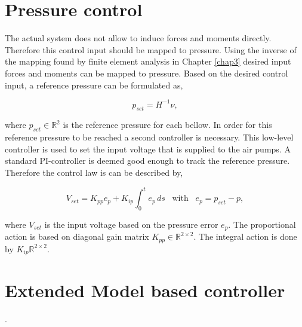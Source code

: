 \section{Pressure control}


The actual system does not allow to induce forces and moments directly. Therefore this control input should be mapped to pressure. Using the inverse of the mapping found by finite element analysis in Chapter \ref{chap3} desired input forces and moments can be mapped to pressure. Based on the desired control input, a reference pressure can be formulated as,

\begin{equation}
    p_{set} = H^{-1}\nu,
\end{equation}


where $p_{set} \in \mathbb{R}^2$ is the reference pressure for each bellow. In order for this reference pressure to be reached a second controller is necessary. This low-level controller is used to set the input voltage that is supplied to the air pumps. A standard PI-controller is deemed good enough to track the reference pressure. Therefore the control law is can be described by,

\begin{equation}
    V_{set} = K_{pp}e_p + K_{ip} \int_0^t e_p \hspace{2pt} ds \hspace{10pt} \text{with} \hspace{10pt} e_p = p_{set} - p,
\end{equation}



where $V_{set}$ is the input voltage based on the pressure error $e_p$. The proportional action is based on diagonal gain matrix $K_{pp} \in \mathbb{R}^{2\times 2}$. The integral action is done by $K_{ip}\mathbb{R}^{2\times 2}$.


\section{Extended Model based controller}.







